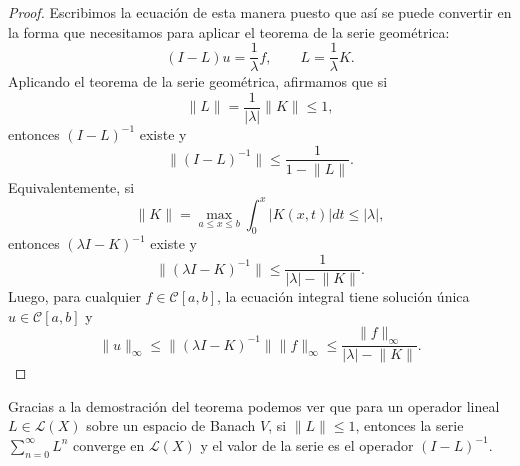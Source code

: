 \begin{corolario}
\begin{proof}
		Escribimos la ecuación de esta manera puesto que así se puede convertir en la forma que necesitamos para aplicar el teorema de la serie geométrica:
		\begin{equation}
			(I-L)u = \dfrac{1}{\lambda}f, \qquad L = \dfrac{1}{\lambda}K.
		\end{equation}
		Aplicando el teorema de la serie geométrica, afirmamos que si
		\begin{equation}
			\lVert L \rVert = \dfrac{1}{|\lambda |}\lVert K \rVert \leq 1,
		\end{equation}
		entonces $(I-L)^{-1}$ existe y
		\begin{equation}
			\lVert(I-L)^{-1}\rVert \leqslant \dfrac{1}{1 - \lVert L \rVert}.
		\end{equation}
		Equivalentemente, si
		\begin{equation}
			\lVert K \rVert = \max_{a \leqslant x \leqslant b} \int_{0}^{x}|K(x,t)|dt \leq |\lambda|,
		\end{equation}
		entonces $(\lambda I - K)^{-1}$ existe y 
		\begin{equation}
			\lVert (\lambda I - K)^{-1}\rVert \leqslant \dfrac{1}{|\lambda| - \lVert K \rVert }.
		\end{equation}
		Luego, para cualquier $f \in \mathcal{C}[a,b]$, la ecuación integral tiene solución única $u \in \mathcal{C}[a,b]$ y 
		\begin{equation}
			\lVert u \rVert_\infty \leqslant \lVert (\lambda I - K)^{-1} \rVert \lVert f \rVert_\infty \leqslant \dfrac{\lVert f \rVert_\infty}{|\lambda| - \lVert K \rVert }.
		\end{equation}
	\end{proof}
\end{corolario}
\begin{observacion}
	Gracias a la demostración del teorema podemos ver que para un operador lineal $L \in \mathcal{L}(X)$ sobre un espacio de Banach $V$, si $\lVert L \rVert \leq 1$, entonces la serie $\sum_{n=0}^{\infty}L^n$ converge en $\mathcal{L}(X)$ y el valor de la serie es el operador $(I-L)^{-1}$.
\end{observacion}
